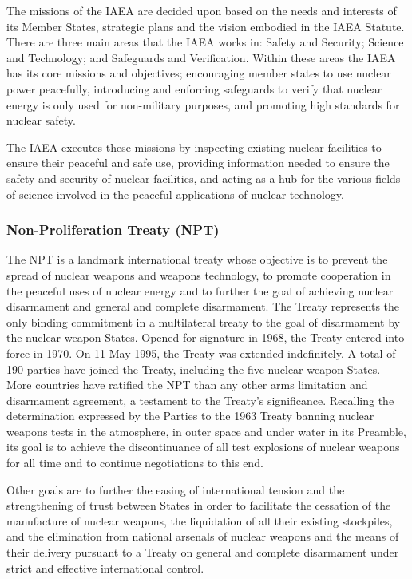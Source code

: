 \documentclass[twoside,titlepage,11pt,twocolumn,a4paper]{article}
\begin{document}
The missions of the IAEA are decided upon based on the needs and
interests of its Member States, strategic plans and the vision
embodied in the IAEA Statute. There are three main areas that the IAEA
works in: Safety and Security; Science and Technology; and Safeguards
and Verification. Within these areas the IAEA has its core missions
and objectives; encouraging member states to use nuclear power
peacefully, introducing and enforcing safeguards to verify that
nuclear energy is only used for non-military purposes, and promoting
high standards for nuclear safety.

The IAEA executes these missions by inspecting existing nuclear
facilities to ensure their peaceful and safe use, providing
information needed to ensure the safety and security of nuclear
facilities, and acting as a hub for the various fields of science
involved in the peaceful applications of nuclear technology.

\subsubsection{Non-Proliferation Treaty (NPT)}
The NPT is a landmark international treaty whose objective is to
prevent the spread of nuclear weapons and weapons technology, to
promote cooperation in the peaceful uses of nuclear energy and to
further the goal of achieving nuclear disarmament and general and
complete disarmament. The Treaty represents the only binding
commitment in a multilateral treaty to the goal of disarmament by the
nuclear-weapon States. Opened for signature in 1968, the Treaty
entered into force in 1970. On 11 May 1995, the Treaty was extended
indefinitely. A total of 190 parties have joined the Treaty, including
the five nuclear-weapon States. More countries have ratified the NPT
than any other arms limitation and disarmament agreement, a testament
to the Treaty's significance. Recalling the determination expressed by
the Parties to the 1963 Treaty banning nuclear weapons tests in the
atmosphere, in outer space and under water in its Preamble, its goal
is to achieve the discontinuance of all test explosions of nuclear
weapons for all time and to continue negotiations to this end.

Other goals are to further the easing of international tension and the
strengthening of trust between States in order to facilitate the
cessation of the manufacture of nuclear weapons, the liquidation of
all their existing stockpiles, and the elimination from national
arsenals of nuclear weapons and the means of their delivery pursuant
to a Treaty on general and complete disarmament under strict and
effective international control. \citep{statement2005}
\end{document}
